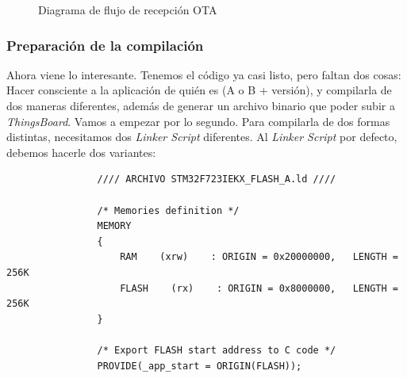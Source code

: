 \documentclass[../main.tex]{subfiles}
\begin{document}
\begin{figure}
                \caption{Diagrama de flujo de recepción OTA}
                \label{fig:ota_update_diagram}
            \end{figure}

        \subsubsection{Preparación de la compilación}

            Ahora viene lo interesante. Tenemos el código ya casi listo, pero faltan dos cosas: Hacer consciente a la aplicación de quién es (A o B + versión), y compilarla de dos maneras diferentes, además de generar un archivo binario que poder subir a \emph{ThingsBoard}. Vamos a empezar por lo segundo. Para compilarla de dos formas distintas, necesitamos dos \emph{Linker Script} diferentes. Al \emph{Linker Script} por defecto, debemos hacerle dos variantes:

            \begin{lstlisting}
                //// ARCHIVO STM32F723IEKX_FLASH_A.ld ////

                /* Memories definition */
                MEMORY
                {
                    RAM    (xrw)    : ORIGIN = 0x20000000,   LENGTH = 256K
                    FLASH    (rx)    : ORIGIN = 0x8000000,   LENGTH = 256K
                }

                /* Export FLASH start address to C code */
                PROVIDE(_app_start = ORIGIN(FLASH));
            \end{lstlisting}
\end{document}
